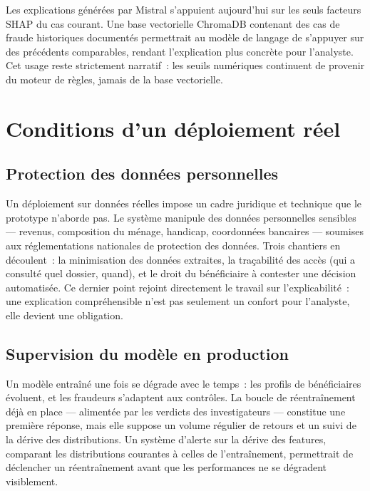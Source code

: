 \documentclass[a4paper, oneside, 12pt]{book}
\begin{document}
\hspace{0.5cm}Les explications générées par Mistral s'appuient aujourd'hui sur les seuls facteurs SHAP du cas courant. Une base vectorielle ChromaDB contenant des cas de fraude historiques documentés permettrait au modèle de langage de s'appuyer sur des précédents comparables, rendant l'explication plus concrète pour l'analyste. Cet usage reste strictement narratif~: les seuils numériques continuent de provenir du moteur de règles, jamais de la base vectorielle.

\section{Conditions d'un déploiement réel}

\subsection{Protection des données personnelles}

\hspace{0.5cm}Un déploiement sur données réelles impose un cadre juridique et technique que le prototype n'aborde pas. Le système manipule des données personnelles sensibles — revenus, composition du ménage, handicap, coordonnées bancaires — soumises aux réglementations nationales de protection des données. Trois chantiers en découlent~: la minimisation des données extraites, la traçabilité des accès (qui a consulté quel dossier, quand), et le droit du bénéficiaire à contester une décision automatisée. Ce dernier point rejoint directement le travail sur l'explicabilité~: une explication compréhensible n'est pas seulement un confort pour l'analyste, elle devient une obligation.

\subsection{Supervision du modèle en production}

\hspace{0.5cm}Un modèle entraîné une fois se dégrade avec le temps~: les profils de bénéficiaires évoluent, et les fraudeurs s'adaptent aux contrôles. La boucle de réentraînement déjà en place — alimentée par les verdicts des investigateurs — constitue une première réponse, mais elle suppose un volume régulier de retours et un suivi de la dérive des distributions. Un système d'alerte sur la dérive des features, comparant les distributions courantes à celles de l'entraînement, permettrait de déclencher un réentraînement avant que les performances ne se dégradent visiblement.
\end{document}
